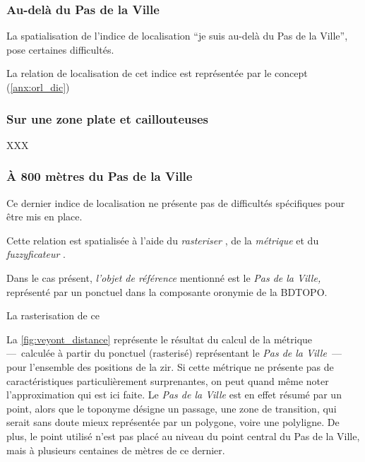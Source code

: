 %   



\subsubsection{Au-delà du Pas de la Ville}

La spatialisation de l'indice de localisation \enquote{je suis au-delà
  du Pas de la Ville}, pose certaines difficultés.

La relation de localisation de cet indice est représentée par le
concept 
(\autoref{anx:orl_dic})

\subsubsection{Sur une zone plate et caillouteuses}

XXX

\subsubsection{À 800 mètres du Pas de la Ville}

Ce dernier indice de localisation ne présente pas de difficultés
spécifiques pour être mis en place.


Cette relation est spatialisée à l'aide du \emph{rasteriser}
, de la \emph{métrique}
 et du \emph{fuzzyficateur}
.

Dans le cas présent, \emph{l'objet de référence} mentionné est le
\emph{Pas de la Ville,} représenté par un ponctuel dans la composante
oronymie de la BDTOPO.


La rasterisation de ce



La \autoref{fig:veyont_distance} représente le résultat du calcul de
la métrique  ---~calculée à partir du ponctuel
(rasterisé) représentant le \emph{Pas de la Ville}~--- pour l'ensemble
des positions de la \ac{zir}. Si cette métrique ne présente pas de
caractéristiques particulièrement surprenantes, on peut quand même
noter l'approximation qui est ici faite. Le \emph{Pas de la Ville} est
en effet résumé par un point, alors que le toponyme désigne un
passage, une zone de transition, qui serait sans doute mieux
représentée par un polygone, voire une polyligne. De plus, le point
utilisé n'est pas placé au niveau du point central du Pas de la Ville,
mais à plusieurs centaines de mètres de ce dernier.


